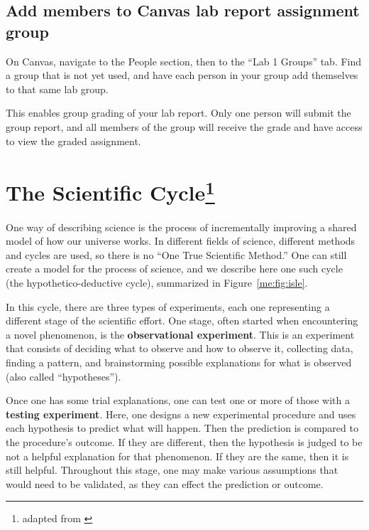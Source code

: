 \subsection{Add members to Canvas lab report assignment group}

\begin{steps}
	\item On Canvas, navigate to the People section, then to the ``Lab 1 Groups'' tab. Find a group that is not yet used, and have each person in your group add themselves to that same lab group.
\end{steps}

This enables group grading of your lab report. Only one person will submit the group report, and all members of the group will receive the grade and have access to view the graded assignment.

\section{The Scientific Cycle\protect\footnote{adapted from \cite{etkina_college_2014}}}

One way of describing science is the process of incrementally improving a shared model of how our universe works. In different fields of science, different methods and cycles are used, so there is no ``One True Scientific Method.'' One can still create a model for the process of science, and we describe here one such cycle (the hypothetico-deductive cycle), summarized in Figure~\ref{me:fig:isle}.

In this cycle, there are three types of experiments, each one representing a different stage of the scientific effort. One stage, often started when encountering a novel phenomenon, is the \textbf{observational experiment}. This is an experiment that consists of deciding what to observe and how to observe it, collecting data, finding a pattern, and brainstorming possible explanations for what is observed (also called ``hypotheses'').

Once one has some trial explanations, one can test one or more of those with a \textbf{testing experiment}. Here, one designs a new experimental procedure and uses each hypothesis to predict what will happen. Then the prediction is compared to the procedure's outcome. If they are different, then the hypothesis is judged to be not a helpful explanation for that phenomenon. If they are the same, then it is still helpful. Throughout this stage, one may make various assumptions that would need to be validated, as they can effect the prediction or outcome.


